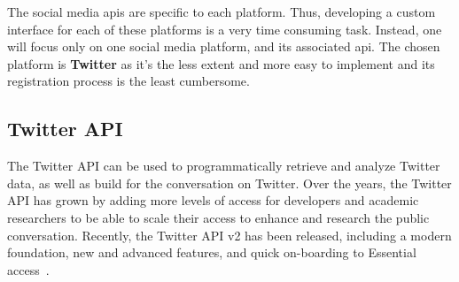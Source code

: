 The social media \glspl{api} are specific to each platform. Thus, developing a
custom interface for each of these platforms is a very time consuming
task. Instead, one will focus only on one social media platform, and its
associated \gls{api}. The chosen platform is \textbf{Twitter} as it's the less
extent and more easy to implement and its registration process is the least cumbersome.

\subsection{Twitter API}
\label{sec:twitter-api}
The Twitter API can be used to programmatically retrieve and analyze Twitter
data, as well as build for the conversation on Twitter. Over the years, the
Twitter API has grown by adding more levels of access for developers and
academic researchers to be able to scale their access to enhance and research
the public conversation. Recently, the Twitter API v2 has been released,
including a modern foundation, new and advanced features, and quick on-boarding
to Essential access~\cite{twitterAbout}.

